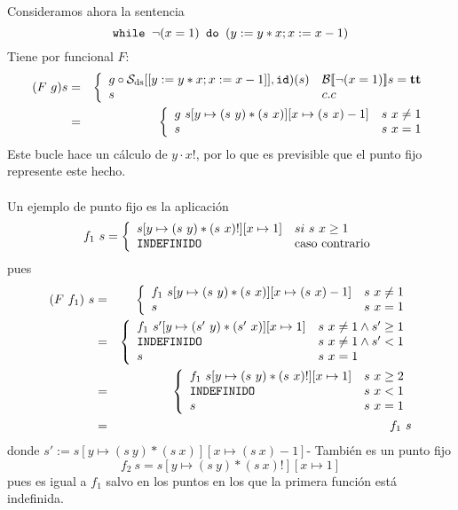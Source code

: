 \begin{example}[Ejercicio 5.3] Consideramos ahora la sentencia
\[
    \texttt{while } \neg(x=1)\texttt{ do } (y:=y*x; x:= x-1)
\]
Tiene por funcional $F$:
\begin{eqnarray*}
    (F\ g) s &=& \left\{\begin{array}{ll}
          g\circ\mathcal{S}_{\mathrm{ds}}[[y:=y*x; x:= x-1]], \texttt{id}) (s) & \mathcal{B}[\![\neg(x=1)]\!]s = \textbf{tt} \\
          s &  c.c
    \end{array}\right. \\
    &=& \left\{\begin{array}{ll}
          g\ s[y\mapsto (s\ y)*(s\ x)][x\mapsto (s\ x)-1]& s\ x\neq 1 \\
          s &  s\ x = 1
    \end{array}\right.
\end{eqnarray*}
Este bucle hace un cálculo de $y\cdot x!$, por lo que es previsible que el punto fijo represente este hecho. \\ \\
Un ejemplo de punto fijo es la aplicación
\[
    f_1\ s = \left\{\begin{array}{ll}
    s[y\mapsto (s\ y)*(s\ x)!][x\mapsto 1] & si\ s\ x\geq 1 \\
    \texttt{INDEFINIDO} & \text{caso contrario}
    \end{array}\right.
\]
pues
\begin{eqnarray*}
    (F\ f_1)\ s &=& \left\{\begin{array}{ll}
          f_1\ s[y\mapsto (s\ y)*(s\ x)][x\mapsto (s\ x)-1]& s\ x\neq 1 \\
          s &  s\ x = 1
    \end{array}\right. \\
    &=& \left\{\begin{array}{ll}
          f_1\ s'[y\mapsto (s'\ y)*(s'\ x)][x\mapsto 1] & s\ x\neq 1 \land s'\geq 1 \\
          \n{INDEFINIDO} & s\ x\neq 1 \land s'< 1 \\
          s &  s\ x = 1
    \end{array}\right. \\
    &=& \left\{\begin{array}{ll}
          f_1\ s[y\mapsto (s\ y)*(s\ x)!][x\mapsto 1] & s\ x \geq 2 \\
          \n{INDEFINIDO} & s\ x < 1 \\
          s &  s\ x = 1
    \end{array}\right.\\ &=& f_1\ s
\end{eqnarray*}
donde $s' := s[y\mapsto (s\ y)*(s\ x)][x\mapsto (s\ x)-1]$-
También es un punto fijo
\[
    f_2\ s = s[y\mapsto (s\ y)*(s\ x)!][x\mapsto 1]
\]
pues es igual a $f_1$ salvo en los puntos en los que la primera función está indefinida.
\end{example}

